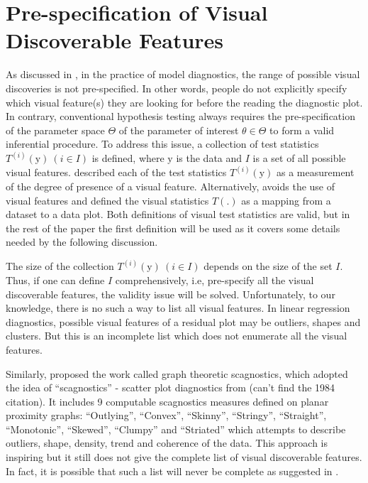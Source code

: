 \documentclass{monashthesis}
\theoremstyle{definition}
\theoremstyle{definition}
\theoremstyle{definition}
\theoremstyle{definition}
\theoremstyle{remark}
\begin{document}
\hypertarget{pre-specification-of-visual-discoverable-features}{%
\section{Pre-specification of Visual Discoverable Features}\label{pre-specification-of-visual-discoverable-features}}

As discussed in \textcite{buja_statistical_2009}, in the practice of model diagnostics, the range of possible visual discoveries is not pre-specified. In other words, people do not explicitly specify which visual feature(s) they are looking for before the reading the diagnostic plot. In contrary, conventional hypothesis testing always requires the pre-specification of the parameter space \(\Theta\) of the parameter of interest \(\theta \in \Theta\) to form a valid inferential procedure. To address this issue, a collection of test statistics \(T^{(i)}(\boldsymbol{\mathrm{y}})~(i \in I)\) is defined, where \(\boldsymbol{\mathrm{y}}\) is the data and \(I\) is a set of all possible visual features. \textcite{buja_statistical_2009} described each of the test statistics \(T^{(i)}(\boldsymbol{\mathrm{y}})\) as a measurement of the degree of presence of a visual feature. Alternatively, \textcite{majumder_validation_2013} avoids the use of visual features and defined the visual statistics \(T(.)\) as a mapping from a dataset to a data plot. Both definitions of visual test statistics are valid, but in the rest of the paper the first definition will be used as it covers some details needed by the following discussion.

The size of the collection \(T^{(i)}(\boldsymbol{\mathrm{y}})~(i \in I)\) depends on the size of the set \(I\). Thus, if one can define \(I\) comprehensively, i.e, pre-specify all the visual discoverable features, the validity issue will be solved. Unfortunately, to our knowledge, there is no such a way to list all visual features. In linear regression diagnostics, possible visual features of a residual plot may be outliers, shapes and clusters. But this is an incomplete list which does not enumerate all the visual features.

Similarly, \textcite{wilkinson_graph-theoretic_2005} proposed the work called graph theoretic scagnostics, which adopted the idea of ``scagnostics'' - scatter plot diagnostics from (can't find the 1984 citation). It includes 9 computable scagnostics measures defined on planar proximity graphs: ``Outlying'', ``Convex'', ``Skinny'', ``Stringy'', ``Straight'', ``Monotonic'', ``Skewed'', ``Clumpy'' and ``Striated'' which attempts to describe outliers, shape, density, trend and coherence of the data. This approach is inspiring but it still does not give the complete list of visual discoverable features. In fact, it is possible that such a list will never be complete as suggested in \textcite{buja_statistical_2009}.
\end{document}

